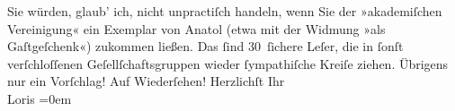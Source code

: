 \begin{ledgroupsized}[t]{13cm}
           \pstart
           Sie würden, glaub’ ich, nicht unpractiſch handeln, wenn Sie der »akademiſchen Vereinigung« ein Exemplar von Anatol (etwa mit der Widmung »als Gaſtgeſchenk«) zukommen ließen.
               Das ſind 30 ſichere Leſer, die in ſonſt verſchloſſenen Geſellſchaftsgruppen wieder
               ſympathiſche Kreiſe ziehen. Übrigens nur ein Vorſchlag! Auf Wiederſehen!\pend
           \pstart
           Herzlichſt Ihr{\\[\baselineskip]}\spacefill\mbox{Loris}\pend
           \leftskip=0em{}
         
         \endnumbering{}\end{ledgroupsized}  \newcommand{\dateiname}{L00163}\newcommand{\titel}{Hugo von Hofmannsthal an Arthur Schnitzler, 25. 1. [1893]}\newcommand{\editorInnen}{Martin Anton Müller und Gerd-Hermann Susen}
      